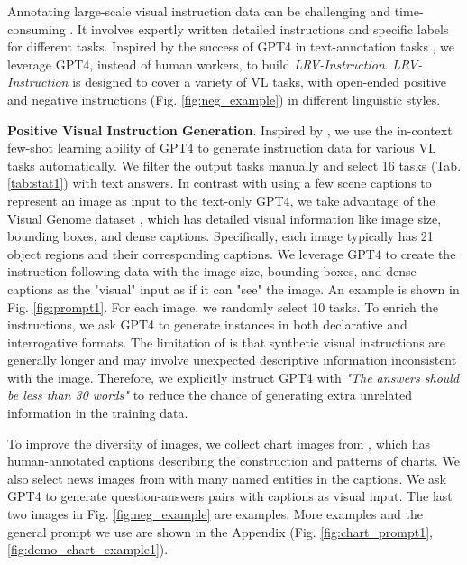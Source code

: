 \vspace{-0.1in}
Annotating large-scale visual instruction data can be challenging and time-consuming \citep{wang2022self}. 
 It involves expertly written detailed instructions and specific labels for different tasks. Inspired by the success of GPT4 in text-annotation tasks \citep{gilardi2023chatgpt}, we leverage GPT4, instead of human workers, to build \textit{LRV-Instruction}. \textit{LRV-Instruction} is designed to cover a variety of VL tasks, with open-ended positive and negative instructions (Fig. \ref{fig:neg_example}) in different linguistic styles.

\textbf{Positive Visual Instruction Generation}. Inspired by \citep{wang2022self}, we use the in-context few-shot learning ability of GPT4 to generate instruction data for various VL tasks automatically. We filter the output tasks manually and select 16 tasks (Tab. \ref{tab:stat1}) with text answers.  In contrast with  \citep{liu2023visual} using a few scene captions to represent an image as input to the text-only GPT4, we take advantage of the Visual Genome dataset \citep{krishna2017visual}, which has detailed visual information like image size, bounding boxes, and dense captions. Specifically, each image typically has 21 object regions and their corresponding captions. We leverage GPT4 %
to create the instruction-following data with the image size, bounding boxes, and dense captions as the "visual" input as if it can "see" the image. An example is shown in Fig. \ref{fig:prompt1}. For each image, we randomly select 10 tasks. 
To enrich the instructions, we ask GPT4 to generate instances in both declarative and interrogative formats. The limitation of \citep{liu2023visual, zhu2023minigpt} is that synthetic visual instructions are generally longer and may involve unexpected descriptive information inconsistent with the image. Therefore, we explicitly instruct GPT4 with \textit{"The answers should be less than 30 words"} to reduce the chance of generating extra unrelated information in the training data.

To improve the diversity of images, we collect chart images from \citep{tang2023vistext}, which has human-annotated captions describing the construction and patterns of charts. We also select news images from \citep{liu2020visual} with many named entities in the captions. We ask GPT4 to generate question-answers pairs with captions as visual input. The last two images in Fig. \ref{fig:neg_example} are examples. More examples and the general prompt we use are shown in the Appendix (Fig. \ref{fig:chart_prompt1}, \ref{fig:demo_chart_example1}). 

